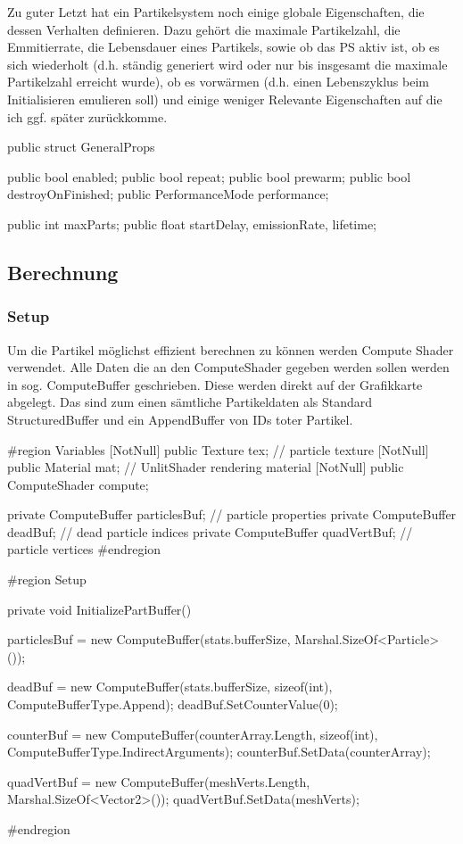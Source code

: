 Zu guter Letzt hat ein Partikelsystem noch einige globale Eigenschaften, die dessen Verhalten definieren. Dazu gehört die maximale Partikelzahl, die Emmitierrate, die Lebensdauer eines Partikels, sowie ob das PS aktiv ist, ob es sich wiederholt (d.h. ständig generiert wird oder nur bis insgesamt die maximale Partikelzahl erreicht wurde), ob es vorwärmen (d.h. einen Lebenszyklus beim Initialisieren emulieren soll) und einige weniger Relevante Eigenschaften auf die ich ggf. später zurückkomme.

\begin{csh}
public struct GeneralProps
{
    public bool enabled;
    public bool repeat;
    public bool prewarm;
    public bool destroyOnFinished;
    public PerformanceMode performance;

    public int maxParts;
    public float startDelay, emissionRate, lifetime;
}
\end{csh}



\subsection{Berechnung}


\subsubsection{Setup}

Um die Partikel möglichst effizient berechnen zu können werden Compute Shader verwendet. Alle Daten die an den ComputeShader gegeben werden sollen werden in sog. ComputeBuffer geschrieben. Diese werden direkt auf der Grafikkarte abgelegt. Das sind zum einen sämtliche Partikeldaten als Standard StructuredBuffer und ein AppendBuffer von IDs toter Partikel.

\begin{csh}
#region Variables
[NotNull] public Texture tex;  // particle texture
[NotNull] public Material mat; // UnlitShader rendering material
[NotNull] public ComputeShader compute;

private ComputeBuffer particlesBuf; // particle properties
private ComputeBuffer deadBuf;      // dead particle indices
private ComputeBuffer quadVertBuf;  // particle vertices
#endregion

#region Setup

private void InitializePartBuffer()
{
    particlesBuf = new ComputeBuffer(stats.bufferSize, Marshal.SizeOf<Particle>());

    deadBuf = new ComputeBuffer(stats.bufferSize, sizeof(int), ComputeBufferType.Append);
    deadBuf.SetCounterValue(0);

    counterBuf = new ComputeBuffer(counterArray.Length, sizeof(int), ComputeBufferType.IndirectArguments);
    counterBuf.SetData(counterArray);

    quadVertBuf = new ComputeBuffer(meshVerts.Length, Marshal.SizeOf<Vector2>());
    quadVertBuf.SetData(meshVerts);
}

#endregion
\end{csh}

